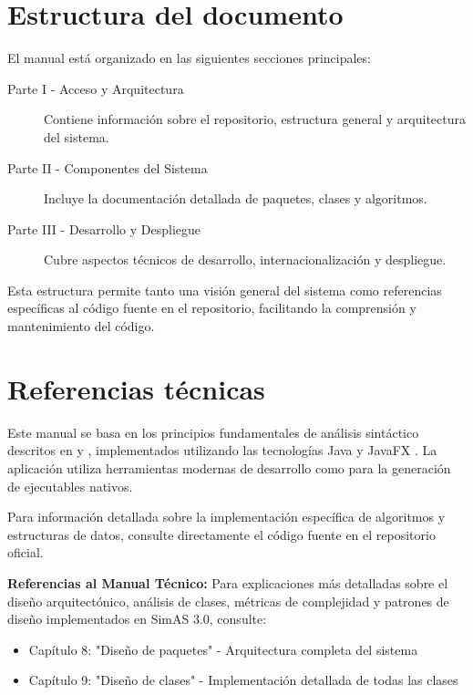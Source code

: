 \section{Estructura del documento}

El manual está organizado en las siguientes secciones principales:

\begin{description}
    \item[Parte I - Acceso y Arquitectura] Contiene información sobre el repositorio, estructura general y arquitectura del sistema.
    \item[Parte II - Componentes del Sistema] Incluye la documentación detallada de paquetes, clases y algoritmos.
    \item[Parte III - Desarrollo y Despliegue] Cubre aspectos técnicos de desarrollo, internacionalización y despliegue.
\end{description}

Esta estructura permite tanto una visión general del sistema como referencias específicas al código fuente en el repositorio, facilitando la comprensión y mantenimiento del código.

\section{Referencias técnicas}

Este manual se basa en los principios fundamentales de análisis sintáctico descritos en \cite{aho2006compilers} y \cite{hopcroft2006introduction}, implementados utilizando las tecnologías Java \cite{java} y JavaFX \cite{javafx}. La aplicación utiliza herramientas modernas de desarrollo como \cite{jpackage} para la generación de ejecutables nativos.

Para información detallada sobre la implementación específica de algoritmos y estructuras de datos, consulte directamente el código fuente en el repositorio oficial.

\textbf{Referencias al Manual Técnico:} Para explicaciones más detalladas sobre el diseño arquitectónico, análisis de clases, métricas de complejidad y patrones de diseño implementados en SimAS 3.0, consulte:
\begin{itemize}
    \item Capítulo 8: "Diseño de paquetes" - Arquitectura completa del sistema
    \item Capítulo 9: "Diseño de clases" - Implementación detallada de todas las clases
\end{itemize}